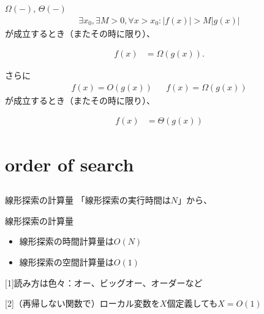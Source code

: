 \documentclass{beamer}
\begin{document}
\begin{frame}[fragile]{$\Omega(-)$, $\Theta(-)$}{}
\begin{align*}
\exists x_{0}, \exists M > 0,  \forall x > x_{0} : |f(x)| > M | g(x) |
\end{align*}
が成立するとき（またその時に限り）、

\begin{align*}
f(x) &= \Omega(g(x)).
\end{align*}

\vfill
さらに
\begin{align*}
f(x) = O(g(x)) && f(x) = \Omega(g(x))
\end{align*}
が成立するとき（またその時に限り）、

\begin{align*}
f(x) &= \Theta(g(x))
\end{align*}
\end{frame}

\section{order of search}		%
\subsection{}

\begin{frame}[fragile]{線形探索の計算量}{}
「線形探索の実行時間は$N$」から、

\begin{block}{線形探索の計算量}
\begin{itemize}\itemsep8pt
\item 線形探索の時間計算量は$O(N)$\footnotemark
\item 線形探索の空間計算量は$O(1)$\footnotemark
\end{itemize}
\end{block}

[1]{読み方は色々：オー、ビッグオー、オーダーなど}

[2]{（再帰しない関数で）ローカル変数を$X$個定義しても$X = O(1)$}

\end{frame}
\end{document}
